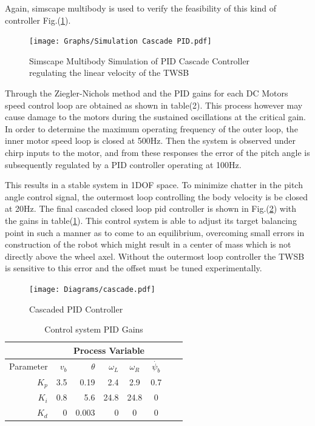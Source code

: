         Again, simscape multibody is used to verify the feasibility of this kind of controller Fig.(\ref{fig:SimPID}).
        \begin{figure}[H]
            \centering
            \texttt{[image: Graphs/Simulation Cascade PID.pdf]}
            \caption{Simscape Multibody Simulation of PID Cascade Controller regulating the linear velocity of the TWSB}
            \label{fig:SimPID}
        \end{figure}

       
        Through the Ziegler-Nichols method and the PID gains for each DC Motors speed control loop 
        are obtained as shown in table(2). This process however may cause damage to the motors 
        during the sustained oscillations at the critical gain. 
        In order to determine the maximum operating frequency of the outer loop, 
        the inner motor speed loop is closed at 500Hz. Then the system is observed under chirp inputs to the motor, and from 
        these responses the error of the pitch angle is subsequently regulated by a PID controller operating at 100Hz.

        This results in a stable system in 1DOF space. To minimize chatter in the pitch angle control signal, the outermost 
        loop controlling the body velocity is be closed at 20Hz.
        The final cascaded closed loop pid controller is shown in Fig.(\ref{fig:Cascade}) with the gains in table(\ref{tab:PIDGains}). 
        This control system is able to adjust its target balancing point in such a manner as to come to an equilibrium, overcoming small 
        errors in construction of the robot which might result in a center of mass  which is not directly above the wheel axel. 
        Without the outermost loop controller the TWSB is sensitive to this error and the offset must be tuned experimentally.

        \begin{figure}[H]
            \texttt{[image: Diagrams/cascade.pdf]}
            \caption{Cascaded PID Controller}
            \label{fig:Cascade}
        \end{figure}

        \begin{table}[H]
            \centering
            \begin{tabular}{|r|r|r|r|c|c|c|c}
                \hline
                & \multicolumn{5}{c|}{Process Variable}  \\
                \hline
                Parameter & $v_b$ & $\theta$  & $\omega_L$ & $\omega_R$ & $\dot{\psi_b}$ \\
                \hline      
                $K_p$ & 3.5 & 0.19 & 2.4 & 2.9 & 0.7 \\
                $K_i$ & 0.8 & 5.6 & 24.8 & 24.8 & 0 \\
                $K_d$ & 0 & 0.003 & 0 & 0  &  0 \\
                \hline
            \end{tabular}
            \caption{Control system PID Gains}
            \label{tab:PIDGains}
        \end{table}
      
